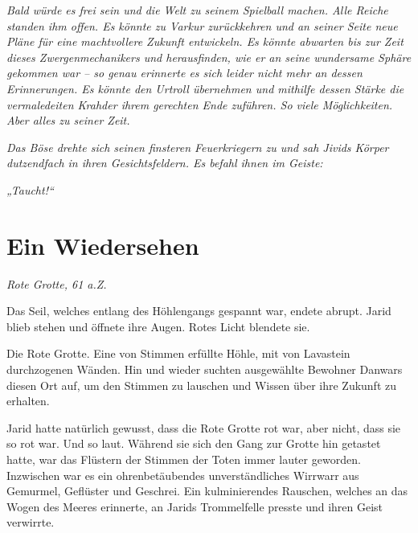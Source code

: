 \textit{Bald würde es frei sein und die Welt zu seinem Spielball machen. Alle Reiche standen ihm offen. Es könnte zu Varkur zurückkehren und an seiner Seite neue Pläne für eine machtvollere Zukunft entwickeln. Es könnte abwarten bis zur Zeit dieses Zwergenmechanikers und herausfinden, wie er an seine wundersame Sphäre gekommen war – so genau erinnerte es sich leider nicht mehr an dessen Erinnerungen. Es könnte den Urtroll übernehmen und mithilfe dessen Stärke die vermaledeiten Krahder ihrem gerechten Ende zuführen. So viele Möglichkeiten. Aber alles zu seiner Zeit.}

\textit{Das Böse drehte sich seinen finsteren Feuerkriegern zu und sah Jivids Körper dutzendfach in ihren Gesichtsfeldern. Es befahl ihnen im Geiste:}

\textit{„Taucht!“}



































\newpage
\section{Ein Wiedersehen}




\textit{Rote Grotte, 61 a.Z.}\bigskip




Das Seil, welches entlang des Höhlengangs gespannt war, endete abrupt. Jarid blieb stehen und öffnete ihre Augen. Rotes Licht blendete sie.

Die Rote Grotte. Eine von Stimmen erfüllte Höhle, mit von Lavastein durchzogenen Wänden. Hin und wieder suchten ausgewählte Bewohner Danwars diesen Ort auf, um den Stimmen zu lauschen und Wissen über ihre Zukunft zu erhalten.

Jarid hatte natürlich gewusst, dass die Rote Grotte rot war, aber nicht, dass sie so rot war. Und so laut. Während sie sich den Gang zur Grotte hin getastet hatte, war das Flüstern der Stimmen der Toten immer lauter geworden. Inzwischen war es ein ohrenbetäubendes unverständliches Wirrwarr aus Gemurmel, Geflüster und Geschrei. Ein kulminierendes Rauschen, welches an das Wogen des Meeres erinnerte, an Jarids Trommelfelle presste und ihren Geist verwirrte.

